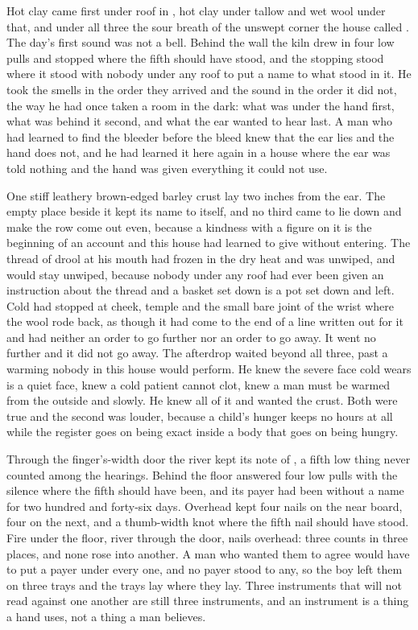 Hot clay came first under  roof in , hot clay under tallow and wet wool under that, and under all three the sour  breath of the unswept corner the house called . The day's first sound was not a bell. Behind the wall the kiln drew in four low pulls and stopped where the fifth should have stood, and the stopping stood where it stood with nobody under any roof to put a name to what stood in it. He took the smells in the order they arrived and the sound in the order it did not, the way he had once taken a room in the dark: what was under the hand first, what was behind it second, and what the ear wanted to hear last. A man who had learned to find the bleeder before the bleed knew that the ear lies and the hand does not, and he had learned it here again in a house where the ear was told nothing and the hand was given everything it could not use.

One stiff leathery brown-edged barley crust lay two inches from the ear. The empty place beside it kept its name to itself, and no third came to lie down and make the row come out even, because a kindness with a figure on it is the beginning of an account and this house had learned to give without entering. The thread of drool at his mouth had frozen in the dry heat and was unwiped, and would stay unwiped, because nobody under any roof had ever been given an instruction about the thread and a basket set down is a pot set down and left. Cold had stopped at cheek, temple and the small bare joint of the wrist where the wool rode back, as though it had come to the end of a line written out for it and had neither an order to go further nor an order to go away. It went no further and it did not go away. The afterdrop waited beyond all three, past a warming nobody in this house would perform. He knew the severe face cold wears is a quiet face, knew a cold patient cannot clot, knew a man must be warmed from the outside and slowly. He knew all of it and wanted the crust. Both were true and the second was louder, because a child's hunger keeps no hours at all while the register goes on being exact inside a body that goes on being hungry.

Through the finger's-width door the river kept its note of , a fifth low thing never counted among the hearings. Behind the floor  answered four low pulls with the silence where the fifth should have been, and its payer had been without a name for two hundred and forty-six days. Overhead  kept four nails on the near board, four on the next, and a thumb-width knot where the fifth nail should have stood. Fire under the floor, river through the door, nails overhead: three counts in three places, and none rose into another. A man who wanted them to agree would have to put a payer under every one, and no payer stood to any, so the boy left them on three trays and the trays lay where they lay. Three instruments that will not read against one another are still three instruments, and an instrument is a thing a hand uses, not a thing a man believes.

